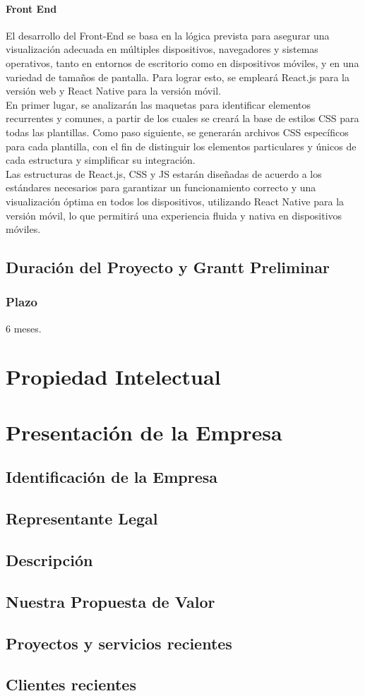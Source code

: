 \documentclass{report}
\begin{document}
					\subsubsection{Front End}	
					El desarrollo del Front-End se basa en la lógica prevista para asegurar una visualización adecuada en múltiples dispositivos, navegadores y sistemas operativos, tanto en entornos de escritorio como en dispositivos móviles, y en una variedad de tamaños de pantalla. Para lograr esto, se empleará React.js para la versión web y React Native para la versión móvil.\\
					\break
					En primer lugar, se analizarán las maquetas para identificar elementos recurrentes y comunes, a partir de los cuales se creará la base de estilos CSS para todas las plantillas. Como paso siguiente, se generarán archivos CSS específicos para cada plantilla, con el fin de distinguir los elementos particulares y únicos de cada estructura y simplificar su integración.\\
					\break
					Las estructuras de React.js, CSS y JS estarán diseñadas de acuerdo a los estándares necesarios para garantizar un funcionamiento correcto y una visualización óptima en todos los dispositivos, utilizando React Native para la versión móvil, lo que permitirá una experiencia fluida y nativa en dispositivos móviles.
		\section{Duración del Proyecto y Grantt Preliminar}	
			\subsection{Plazo}
				6 meses.
	
	\chapter{Propiedad Intelectual}
	
	\chapter{Presentación de la Empresa}
		\section{Identificación de la Empresa}
		\section{Representante Legal}
		\section{Descripción}
		\section{Nuestra Propuesta de Valor}
		\section{Proyectos y servicios recientes}
		\section{Clientes recientes}
	
\end{document}
